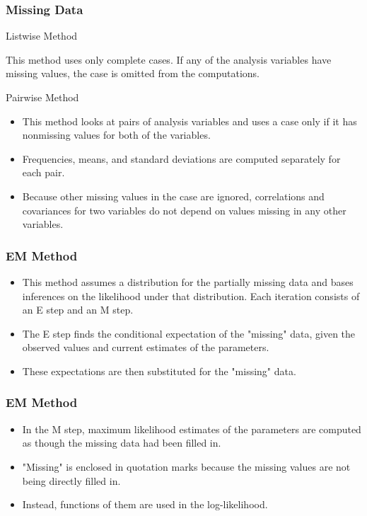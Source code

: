 \documentclass[MASTER.tex]{subfiles}
\begin{document}
	\begin{frame}
\frametitle{Missing Data}
		\Large
		
Listwise Method

This method uses only complete cases. If any of the analysis variables have missing values, the case is omitted from the computations.

	\end{frame}
	\begin{frame}
		\Large
Pairwise Method
\begin{itemize}
\item This method looks at pairs of analysis variables and uses a case only if it has nonmissing values for both of the variables. 
\item Frequencies, means, and standard deviations are computed separately for each pair. 
\item Because other missing values in the case are ignored, correlations and covariances for two variables do not depend on values missing in any other variables.
\end{itemize}


	\end{frame}
	\begin{frame}
		\Large
\frametitle{EM Method}
\begin{itemize}
\item This method assumes a distribution for the partially missing data and bases inferences on the likelihood under that distribution. Each iteration consists of an E step and an M step. 
\item The E step finds the conditional expectation of the "missing" data, given the observed values and current estimates of the parameters. 
\item These expectations are then substituted for the "missing" data. 
\end{itemize}
	\end{frame}
	\begin{frame}
		\Large
		\frametitle{EM Method}
	\begin{itemize}
	\item	In the M step, maximum likelihood estimates of the parameters are computed as though the missing data had been filled in.
	\item "Missing" is enclosed in quotation marks because the missing values are not being directly filled in. \item Instead, functions of them are used in the log-likelihood.
	\end{itemize}


	\end{frame}
\end{document}
